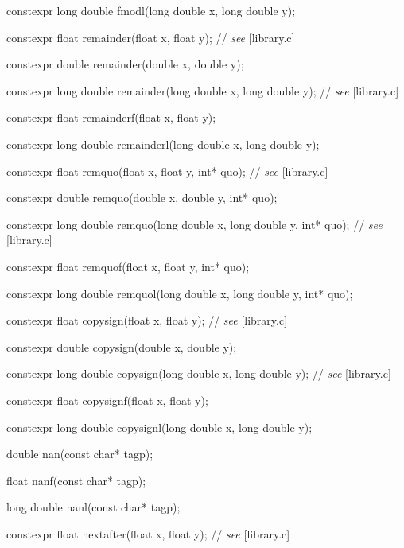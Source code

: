 \documentclass[prd,twocolumn,amsmath,amssymb,nofootinbib,eqsecnum]{revtex4-1}
\newcommand{\highlight}[1]{{\color{red} #1}}
\newcommand{\stdcomment}[1]{{// {\it see} [#1]}}
\begin{document}
{\highlight{constexpr} long double fmodl(long double x, long double y);

\vspace{2ex}

\highlight{constexpr} float remainder(float x, float y); \stdcomment{library.c}

\highlight{constexpr} double remainder(double x, double y);

\highlight{constexpr} long double remainder(long double x, long double y); \stdcomment{library.c}

\highlight{constexpr} float remainderf(float x, float y);

\highlight{constexpr} long double remainderl(long double x, long double y);

\vspace{2ex}

\highlight{constexpr}  float remquo(float x, float y, int* quo); \stdcomment{library.c}

\highlight{constexpr}  double remquo(double x, double y, int* quo);

\highlight{constexpr}  long double remquo(long double x, long double y, int* quo); \stdcomment{library.c}

\highlight{constexpr}  float remquof(float x, float y, int* quo);

\highlight{constexpr}  long double remquol(long double x, long double y, int* quo);

\vspace{2ex}

\highlight{constexpr} float copysign(float x, float y); \stdcomment{library.c}

\highlight{constexpr} double copysign(double x, double y);

\highlight{constexpr} long double copysign(long double x, long double y); \stdcomment{library.c}

\highlight{constexpr} float copysignf(float x, float y);

\highlight{constexpr} long double copysignl(long double x, long double y);

\vspace{2ex}

double nan(const char* tagp);

float nanf(const char* tagp);

long double nanl(const char* tagp);

\vspace{2ex}

\highlight{constexpr}  float nextafter(float x, float y); \stdcomment{library.c}

}
\end{document}
